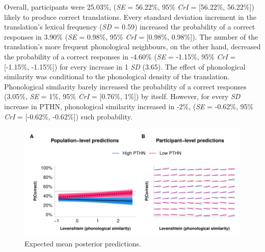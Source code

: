 \documentclass[
  man]{apa6}
\begin{document}
Overall, participants were 25.03\%, (\emph{SE} = 56.22\%, 95\%
\emph{CrI} = {[}56.22\%, 56.22\%{]}) likely to produce correct
translations. Every standard deviation increment in the translation's
lexical frequency (\emph{SD} = 0.59) increased the probability of a
correct responses in 3.90\% (\emph{SE} = 0.98\%, 95\% \emph{CrI} =
{[}0.98\%, 0.98\%{]}). The number of the translation's more frequent
phonological neighbours, on the other hand, decreased the probability of
a correct responses in -4.60\% (\emph{SE} = -1.15\%, 95\% \emph{CrI} =
{[}-1.15\%, -1.15\%{]}) for every increase in 1 \emph{SD} (3.65). The
effect of phonological similarity was conditional to the phonological
density of the translation. Phonological similarity barely increased the
probability of a correct responses (3.05\%, \emph{SE} = 1\%, 95\%
\emph{CrI} = {[}0.76\%, 1\%{]}) by itself. However, for every \emph{SD}
increase in PTHN, phonological similarity increased in -2\%, (\emph{SE}
= -0.62\%, 95\% \emph{CrI} = {[}-0.62\%, -0.62\%{]}) such probability.

\begin{figure}
\centering
\includegraphics{manuscript_files/figure-latex/marginal_effects-1.pdf}
\caption{Expected mean posterior predictions.}
\end{figure}
\end{document}
